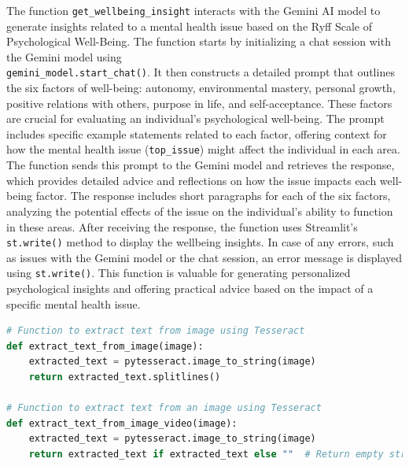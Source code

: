 \noindent
The function \texttt{get\_wellbeing\_insight} interacts with the Gemini AI model to generate insights related to a mental health issue based on the Ryff Scale of Psychological Well-Being. The function starts by initializing a chat session with the Gemini model using \\
\texttt{gemini\_model.start\_chat()}. It then constructs a detailed prompt that outlines the six factors of well-being: autonomy, environmental mastery, personal growth, positive relations with others, purpose in life, and self-acceptance. These factors are crucial for evaluating an individual's psychological well-being. The prompt includes specific example statements related to each factor, offering context for how the mental health issue (\texttt{top\_issue}) might affect the individual in each area. The function sends this prompt to the Gemini model and retrieves the response, which provides detailed advice and reflections on how the issue impacts each well-being factor. The response includes short paragraphs for each of the six factors, analyzing the potential effects of the issue on the individual's ability to function in these areas. After receiving the response, the function uses Streamlit's \texttt{st.write()} method to display the wellbeing insights. In case of any errors, such as issues with the Gemini model or the chat session, an error message is displayed using \texttt{st.write()}. This function is valuable for generating personalized psychological insights and offering practical advice based on the impact of a specific mental health issue.


\begin{tcolorbox}[colback=gray!5!white, colframe=gray!80!black, boxrule=0.5pt, title=Extract Text from Image Using Tesseract]
    \begin{lstlisting}[language=Python]
# Function to extract text from image using Tesseract
def extract_text_from_image(image):
    extracted_text = pytesseract.image_to_string(image)
    return extracted_text.splitlines()

# Function to extract text from an image using Tesseract
def extract_text_from_image_video(image):
    extracted_text = pytesseract.image_to_string(image)
    return extracted_text if extracted_text else ""  # Return empty string if no text is found
    \end{lstlisting}
\end{tcolorbox}

